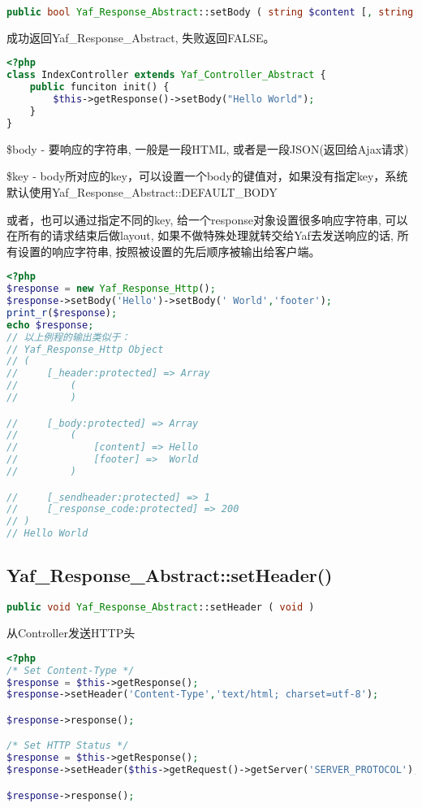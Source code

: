 \begin{lstlisting}[language=PHP]
public bool Yaf_Response_Abstract::setBody ( string $content [, string $key ] )
\end{lstlisting}

成功返回Yaf\_Response\_Abstract, 失败返回FALSE。

\begin{lstlisting}[language=PHP]
<?php
class IndexController extends Yaf_Controller_Abstract {
    public funciton init() {
        $this->getResponse()->setBody("Hello World");
    }
}
\end{lstlisting}

\begin{compactitem}
\item \$body - 要响应的字符串, 一般是一段HTML, 或者是一段JSON(返回给Ajax请求)
\item \$key - body所对应的key，可以设置一个body的键值对，如果没有指定key，系统默认使用Yaf\_Response\_Abstract::DEFAULT\_BODY
\end{compactitem}

或者，也可以通过指定不同的key, 给一个response对象设置很多响应字符串, 可以在所有的请求结束后做layout, 如果不做特殊处理就转交给Yaf去发送响应的话, 所有设置的响应字符串, 按照被设置的先后顺序被输出给客户端。


\begin{lstlisting}[language=PHP]
<?php
$response = new Yaf_Response_Http();
$response->setBody('Hello')->setBody(' World','footer');
print_r($response);
echo $response;
// 以上例程的输出类似于：
// Yaf_Response_Http Object
// (
//     [_header:protected] => Array
//         (
//         )

//     [_body:protected] => Array
//         (
//             [content] => Hello
//             [footer] =>  World
//         )

//     [_sendheader:protected] => 1
//     [_response_code:protected] => 200
// )
// Hello World
\end{lstlisting}

\subsection{Yaf\_Response\_Abstract::setHeader()}


\begin{lstlisting}[language=PHP]
public void Yaf_Response_Abstract::setHeader ( void )
\end{lstlisting}

\begin{example}
从Controller发送HTTP头
\begin{lstlisting}[language=PHP]
<?php
/* Set Content-Type */
$response = $this->getResponse();
$response->setHeader('Content-Type','text/html; charset=utf-8');

$response->response();

/* Set HTTP Status */
$response = $this->getResponse();
$response->setHeader($this->getRequest()->getServer('SERVER_PROTOCOL'),'404 NOT FOUND');

$response->response();
\end{lstlisting}
\end{example}

